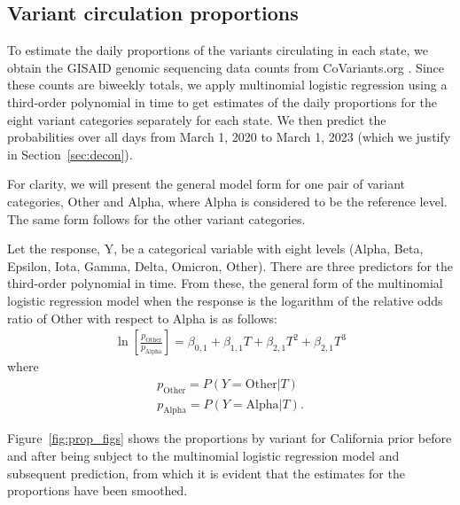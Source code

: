 \documentclass{article}
\begin{document}
\subsection{Variant circulation proportions}

To estimate the daily proportions of the variants circulating in each state, we
obtain the GISAID genomic sequencing data counts from CoVariants.org
\citep{hodcroft2021covariants, elbe2017data}. Since these counts are biweekly totals, we
apply multinomial logistic regression using a third-order polynomial in time to
get estimates of the daily proportions for the eight variant categories
separately for each state. We then predict the probabilities over all days from 
March 1, 2020 to March 1, 2023 (which we justify in Section~\ref{sec:decon}).

For clarity, we will present the general model form for one pair of variant categories, Other and Alpha, where Alpha is considered to be the reference level.
The same form follows for the other variant categories.

Let the response, Y, be a categorical variable with eight levels (Alpha, Beta, Epsilon, Iota, Gamma, Delta, Omicron, Other). There are three predictors for the third-order polynomial in time. From these, the general form of the multinomial logistic regression model when the response is the logarithm of the relative odds ratio of Other with respect to Alpha is as follows:
\begin{align*}
\ln\left [ \frac{p_{\text{Other}}} {p_{\text{Alpha}}} \right ] = \beta_{0,1} + \beta_{1,1}T + \beta_{2,1}T^2 + \beta_{2,1}T^3
\end{align*}
where
\begin{align*}
p_{\text{Other}} = P(Y = \text{Other} | T) \\
p_{\text{Alpha}} = P(Y = \text{Alpha} | T).
\end{align*}

Figure~\ref{fig:prop_figs} shows the proportions by variant for California prior before and after being subject to the multinomial logistic regression model and subsequent prediction, from which it is evident that the estimates for the proportions have been smoothed.
\end{document}
